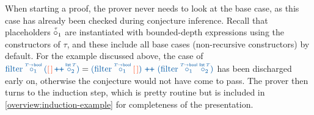 When starting a proof, the prover never needs to look at the base case,
as this case has already been checked during conjecture inference.
Recall that placeholders $\pholder{1}{\tau~}$ are instantiated with bounded-depth expressions using the constructors of $\tau$,
and these include all base cases (non-recursive constructors) by default.
For the example discussed above, the case of
${\clrterm\tfilter\pholder{1}{T\!\to\tbool}({\clrsymex\lnil}
    \concat \pholder{2}{\tlist\,T})}
=    
  {\clrterm{(\tfilter\pholder{1}{T\!\to\tbool}  
  {\clrsymex\lnil})}
    \,\concat\,
    {(\tfilter\pholder{1}{T\!\to\tbool}\pholder{2}{\tlist\,T})}}$
has been discharged early on, otherwise the conjecture would not have come to pass.
The prover then turns to the induction step, which is pretty routine but
is included in \autoref{overview:induction-example} for completeness of the presentation.
